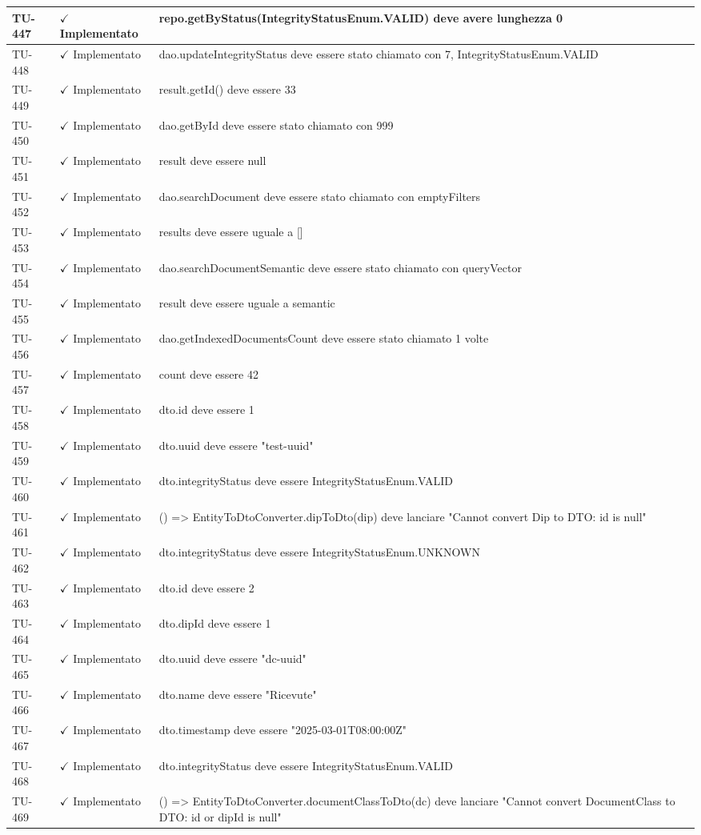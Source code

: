 ﻿\documentclass[a4paper,12pt]{article}
\newcommand{\ok}{\textcolor{green!60!black}{$\checkmark$ Implementato}}
\begin{document}
\begin{longtable}{|p{2cm}|p{3.5cm}|p{9.5cm}|}
\hline
TU-447 & \ok & repo.getByStatus(IntegrityStatusEnum.VALID) deve avere lunghezza 0 \\
\hline
TU-448 & \ok & dao.updateIntegrityStatus deve essere stato chiamato con 7, IntegrityStatusEnum.VALID \\
\hline
TU-449 & \ok & result.getId() deve essere 33 \\
\hline
TU-450 & \ok & dao.getById deve essere stato chiamato con 999 \\
\hline
TU-451 & \ok & result deve essere null \\
\hline
TU-452 & \ok & dao.searchDocument deve essere stato chiamato con emptyFilters \\
\hline
TU-453 & \ok & results deve essere uguale a [] \\
\hline
TU-454 & \ok & dao.searchDocumentSemantic deve essere stato chiamato con queryVector \\
\hline
TU-455 & \ok & result deve essere uguale a semantic \\
\hline
TU-456 & \ok & dao.getIndexedDocumentsCount deve essere stato chiamato 1 volte \\
\hline
TU-457 & \ok & count deve essere 42 \\
\hline
TU-458 & \ok & dto.id deve essere 1 \\
\hline
TU-459 & \ok & dto.uuid deve essere "test-uuid" \\
\hline
TU-460 & \ok & dto.integrityStatus deve essere IntegrityStatusEnum.VALID \\
\hline
TU-461 & \ok & () => EntityToDtoConverter.dipToDto(dip) deve lanciare "Cannot convert Dip to DTO: id is null" \\
\hline
TU-462 & \ok & dto.integrityStatus deve essere IntegrityStatusEnum.UNKNOWN \\
\hline
TU-463 & \ok & dto.id deve essere 2 \\
\hline
TU-464 & \ok & dto.dipId deve essere 1 \\
\hline
TU-465 & \ok & dto.uuid deve essere "dc-uuid" \\
\hline
TU-466 & \ok & dto.name deve essere "Ricevute" \\
\hline
TU-467 & \ok & dto.timestamp deve essere "2025-03-01T08:00:00Z" \\
\hline
TU-468 & \ok & dto.integrityStatus deve essere IntegrityStatusEnum.VALID \\
\hline
TU-469 & \ok & () => EntityToDtoConverter.documentClassToDto(dc) deve lanciare "Cannot convert DocumentClass to DTO: id or dipId is null" \\

\end{longtable}
\end{document}
